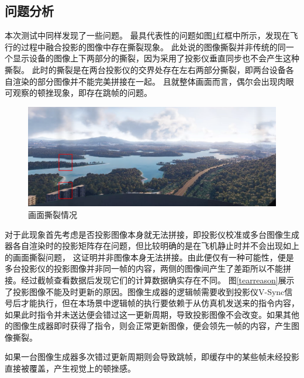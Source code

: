 \subsection{问题分析}
本次测试中同样发现了一些问题。
最具代表性的问题如图\ref{tear}红框中所示，发现在飞行的过程中融合投影的图像中存在撕裂现象。
此处说的图像撕裂并非传统的同一个显示设备的图像上下两部分的撕裂，因为采用了投影仪垂直同步也不会产生这种撕裂。
此时的撕裂是在两台投影仪的交界处存在左右两部分撕裂，即两台设备各自渲染的部分图像并不能完美拼接在一起。
且就整体画面而言，偶尔会出现肉眼可观察的顿挫现象，即存在跳帧的问题。
\begin{figure}[h!]
    \begin{center}
        \includegraphics[width=\textwidth]{pictures/tearmark.png}
        \caption{画面撕裂情况}
        \label{tear}
    \end{center}
\end{figure}
\par
对于此现象首先考虑是否投影图像本身就无法拼接，即投影仪校准或多台图像生成器各自渲染时的投影矩阵存在问题，但比较明确的是在飞机静止时并不会出现如上的画面撕裂问题，
这证明并非图像本身无法拼接。由此便仅有一种可能性，便是多台投影仪的投影图像并非同一帧的内容，两侧的图像间产生了差距所以不能拼接。经过截帧查看数据后发现它们的计算数据确实存在不同。
图\ref{tearreason}展示了投影图像不能及时更新的原因。图像生成器的逻辑帧需要收到投影仪V-Sync信号后才能执行，但在本场景中逻辑帧的执行要依赖于从仿真机发送来的指令内容，
如果此时指令并未送达便会错过这一更新周期，导致投影图像不会改变。如果其他的图像生成器即时获得了指令，则会正常更新图像，便会领先一帧的内容，产生图像撕裂。
\par
如果一台图像生成器多次错过更新周期则会导致跳帧，即缓存中的某些帧未经投影直接被覆盖，产生视觉上的顿挫感。
